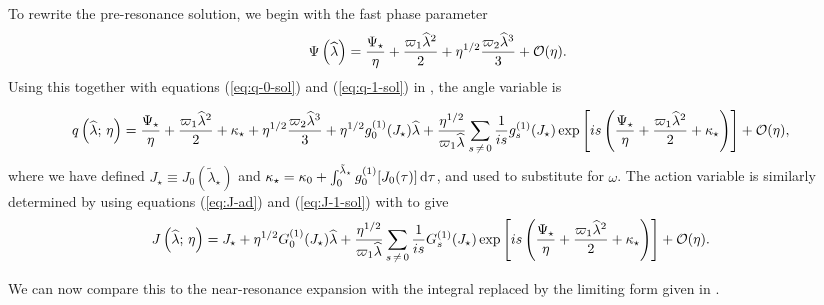 To rewrite the pre-resonance solution, we begin with the fast phase parameter
\pagebreak
\begin{equation}
\Psi\left(\widehat{\lambda}\right) = \dfrac{\Psi_\star}{\eta} + \dfrac{\varpi_1\widehat{\lambda}^2}{2} + \eta^{1/2}\dfrac{\varpi_2\widehat{\lambda}^3}{3} + \mathcal{O}({\eta}).
\end{equation}
Using this together with equations (\ref{eq:q-0-sol}) and (\ref{eq:q-1-sol}) in , the angle variable is
\begin{widetext}
\begin{align}
q\left(\widehat{\lambda};\,\eta\right) = {} & \dfrac{\Psi_\star}{\eta} + \dfrac{\varpi_1\widehat{\lambda}^2}{2} + \kappa_\star + \eta^{1/2}\dfrac{\varpi_2\widehat{\lambda}^3}{3} + \eta^{1/2}g_0^{(1)}(J_\star)\widehat{\lambda} + \dfrac{\eta^{1/2}}{\varpi_1\widehat{\lambda}}\sum_{s\,\neq\,0}\frac{1}{is}g_s^{(1)}(J_\star)\exp\left[is\left(\dfrac{\Psi_\star}{\eta} + \dfrac{\varpi_1\widehat{\lambda}^2}{2} + \kappa_\star\right)\right] + \mathcal{O}({\eta}),
\end{align}
where we have defined $J_\star \equiv J_0\left(\widetilde{\lambda}_\star\right)$ and $\kappa_\star = \kappa_0 + \int_{0}^{\tilde{\lambda}_\star}{g_0^{(1)}[J_0(\tau)]}\,\mathrm{d}{\tau}$, and used  to substitute for $\omega$. The action variable is similarly determined by using equations (\ref{eq:J-ad}) and (\ref{eq:J-1-sol}) with  to give
\begin{align}
J\left(\widehat{\lambda};\,\eta\right) = {} & J_\star + \eta^{1/2}G_0^{(1)}(J_\star)\widehat{\lambda} + \dfrac{\eta^{1/2}}{\varpi_1\widehat{\lambda}}\sum_{s\,\neq\,0}\frac{1}{is}G_s^{(1)}(J_\star)\exp\left[is\left(\dfrac{\Psi_\star}{\eta} + \dfrac{\varpi_1\widehat{\lambda}^2}{2} + \kappa_\star\right)\right] + \mathcal{O}({\eta}).
\end{align}
\end{widetext}
We can now compare this to the near-resonance expansion with the integral replaced by the limiting form given in .

